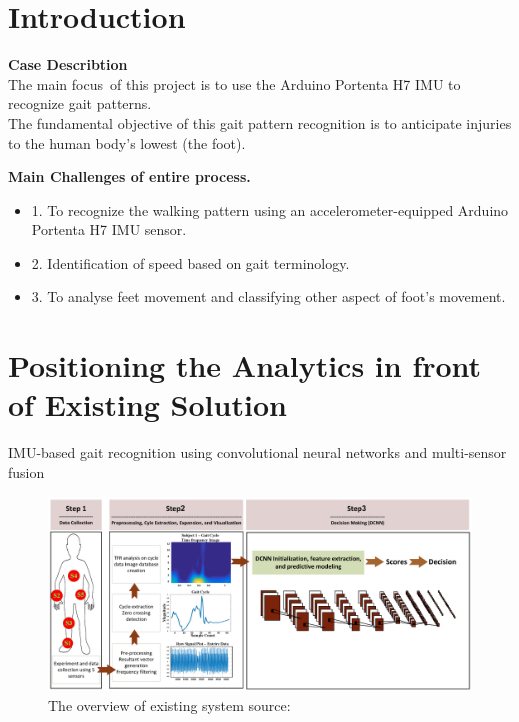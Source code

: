 \section{Introduction}

\STANDARD{\insertsection}
{ 
 \textbf{Case Describtion}\\
The main focus of this project is to use the Arduino Portenta H7 IMU to recognize gait patterns.\\
\bigskip
The fundamental objective of this gait pattern recognition is to anticipate injuries to the human body's lowest (the foot).

\bigskip

\textbf{Main Challenges of entire process. }\\
\bigskip
\begin{itemize}
    \item 1. To recognize the walking pattern using an accelerometer-equipped Arduino Portenta H7 IMU sensor.
    \item 2. Identification of speed based on gait terminology.
    \item 3. To analyse feet movement and classifying other aspect of foot's movement.
\end{itemize}
}

\section{Positioning the Analytics in front of Existing Solution}
\STANDARD{\insertsection}
{ 
IMU-based gait recognition using convolutional neural networks and multi-sensor fusion
    \begin{figure}[h]
    \centering
    \includegraphics[scale=0.08]{img/The overview of our existing system for Human Gait Identification.png}
    \caption{The overview of existing system source: \cite{Dehzangi2017}}
    \label{fig:The overview of existing system for Human Gait Identification}
\end{figure}
    
}


